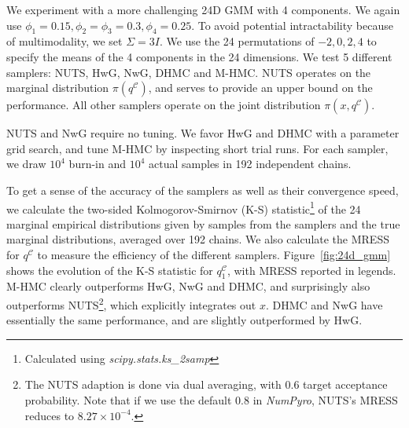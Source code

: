 \documentclass{article}
\newcommand{\calc}{\mathcal{C}}
\begin{document}
We experiment with a more challenging 24D GMM with 4 components. We again use $\phi_1=0.15, \phi_2=\phi_3=0.3, \phi_4=0.25$. To avoid potential intractability because of multimodality, we set $\Sigma=3I$. We use the 24 permutations of $-2, 0, 2, 4$ to specify the means of the 4 components in the 24 dimensions. We test 5 different samplers: NUTS, HwG, NwG, DHMC and M-HMC. NUTS operates on the marginal distribution $\pi(q^\calc)$, and serves to provide an upper bound on the performance. All other samplers operate on the joint distribution $\pi(x, q^\calc)$.

\vspace*{-4pt}

NUTS and NwG require no tuning. We favor HwG and DHMC with a parameter grid search, and tune M-HMC by inspecting short trial runs. For each sampler, we draw $10^4$ burn-in and $10^4$ actual samples in 192 independent chains.

\vspace*{-4pt}

To get a sense of the accuracy of the samplers as well as their convergence speed, we calculate the two-sided Kolmogorov-Smirnov (K-S) statistic\footnote{Calculated using \textit{scipy.stats.ks\_2samp}} of the 24 marginal empirical distributions given by samples from the samplers and the true marginal distributions, averaged over 192 chains. We also calculate the MRESS for $q^\calc$ to measure the efficiency of the different samplers. Figure~\ref{fig:24d_gmm} shows the evolution of the K-S statistic for $q^\calc_1$, with MRESS reported in legends. M-HMC clearly outperforms HwG, NwG and DHMC, and surprisingly also outperforms NUTS\footnote{The NUTS adaption is done via dual averaging, with 0.6 target acceptance probability. Note that if we use the default 0.8 in \textit{NumPyro}, NUTS's MRESS reduces to $8.27\times 10^{-4}$.}, which explicitly integrates out $x$. DHMC and NwG have essentially the same performance, and are slightly outperformed by HwG.


\vspace*{-8pt}
\end{document}
